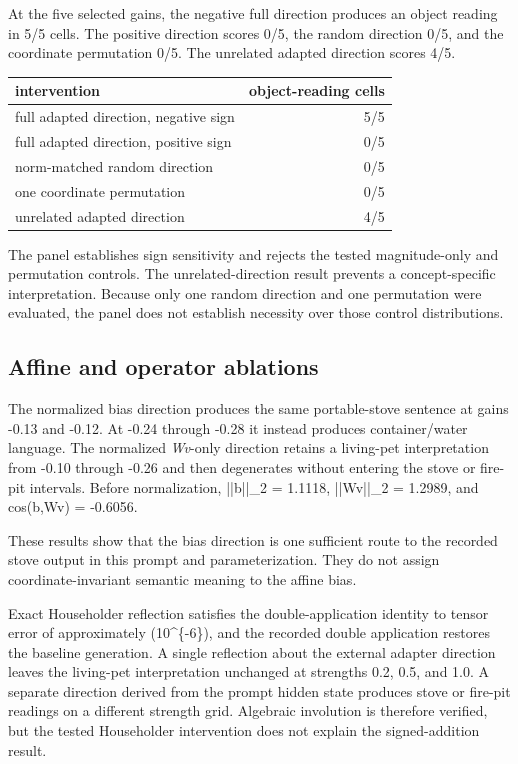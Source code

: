 \documentclass[11pt]{article}
\begin{document}
At the five selected gains, the negative full direction produces an object
reading in 5/5 cells. The positive direction scores 0/5, the random direction
0/5, and the coordinate permutation 0/5. The unrelated adapted direction scores
4/5.

\begin{center}
\small
\begin{tabular}{lr}
\toprule
intervention & object-reading cells \\
\midrule
full adapted direction, negative sign & 5/5 \\
full adapted direction, positive sign & 0/5 \\
norm-matched random direction & 0/5 \\
one coordinate permutation & 0/5 \\
unrelated adapted direction & 4/5 \\
\bottomrule
\end{tabular}
\end{center}


The panel establishes sign sensitivity and rejects the tested magnitude-only
and permutation controls. The unrelated-direction result prevents a
concept-specific interpretation. Because only one random direction and one
permutation were evaluated, the panel does not establish necessity over those
control distributions.

\subsection{Affine and operator ablations}


The normalized bias direction produces the same portable-stove sentence at
gains -0.13 and -0.12. At -0.24 through -0.28 it instead produces
container/water language. The normalized \emph{Wv}-only direction retains a
living-pet interpretation from -0.10 through -0.26 and then degenerates without
entering the stove or fire-pit intervals. Before normalization, ||b||\_2 =
1.1118, ||Wv||\_2 = 1.2989, and cos(b,Wv) = -0.6056.

These results show that the bias direction is one sufficient route to the
recorded stove output in this prompt and parameterization. They do not assign
coordinate-invariant semantic meaning to the affine bias.

Exact Householder reflection satisfies the double-application identity to
tensor error of approximately (10\textasciicircum{}\{-6\}), and the recorded double application
restores the baseline generation. A single reflection about the external
adapter direction leaves the living-pet interpretation unchanged at strengths
0.2, 0.5, and 1.0. A separate direction derived from the prompt hidden state
produces stove or fire-pit readings on a different strength grid. Algebraic
involution is therefore verified, but the tested Householder intervention does
not explain the signed-addition result.
\end{document}
